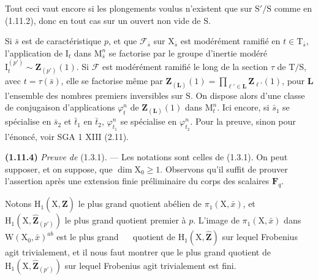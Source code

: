 \documentclass[11pt,leqno]{article}
\newcommand{\Page}[1]{\ifvmode\noindent\else\unskip\ \fi{\footnotesize\textcolor{gray}{[p.\,#1]}}\ \ignorespaces}
\begin{document}
Tout ceci vaut encore si les plongements voulus n’existent que sur \(\mathrm{S}'/\mathrm{S}\) comme en (1.11.2), donc en tout cas sur un ouvert non vide de \(\mathrm{S}\).

Si \(\bar{s}\) est de caractéristique \(p\), et que \(\mathscr{F}_{\bar{s}}\) sur \(\mathrm{X}_{\bar{s}}\) est modérément ramifié en \(t\in\mathrm{T}_{\bar{s}}\), l’application de \(\mathrm{I}_t\) dans \(\mathrm{M}_{\bar{s}}^n\) se factorise par le groupe d’inertie modéré \(\mathrm{I}_t^{(p')}\sim\mathbf{Z}_{(p')}(1)\). Si \(\mathscr{F}\) est modérément ramifié le long de la section \(\tau\) de \(\mathrm{T}/\mathrm{S}\), avec \(t=\tau(\bar{s})\), elle se factorise même par \(\mathbf{Z}_{(\mathbf{L})}(1)=\displaystyle\prod_{\ell'\in\mathbf{L}}\mathbf{Z}_{\ell'}(1)\), pour \(\mathbf{L}\) l’ensemble des nombres premiers inversibles sur \(\mathrm{S}\). On dispose alors d’une classe de conjugaison d’applications \(\varphi_t^n\) de \(\mathbf{Z}_{(\mathbf{L})}(1)\) dans \(\mathrm{M}_t^n\). Ici encore, si \(\bar{s}_1\) se spécialise en \(\bar{s}_2\) et \(\bar{t}_1\) en \(\bar{t}_2\), \(\varphi_{t_1}^n\) se spécialise en \(\varphi_{t_2}^n\). Pour la preuve, sinon pour l’énoncé, voir SGA 1 XIII (2.11).

\textbf{(1.11.4)} \textit{Preuve de} (1.3.1). — Les notations sont celles de (1.3.1). On peut supposer, et on suppose, que \(\dim\mathrm{X}_0\geq1\). Observons qu’il suffit de prouver l’assertion après une extension finie préliminaire du corps des scalaires \(\mathbf{F}_q\).

Notons \(\mathrm{H}_1(\mathrm{X},\widehat{\mathbf{Z}})\) le plus grand quotient abélien de \(\pi_1(\mathrm{X},\bar{x})\), et \(\mathrm{H}_1(\mathrm{X},\widehat{\mathbf{Z}}_{(p')})\) le plus grand quotient premier à \(p\). L’image de \(\pi_1(\mathrm{X},\bar{x})\) dans \(\mathrm{W}(\mathrm{X}_0,\bar{x})^{ab}\) est le plus grand
\Page{186}
quotient de \(\mathrm{H}_1(\mathrm{X},\widehat{\mathbf{Z}})\) sur lequel Frobenius agit trivialement, et il nous faut montrer que le plus grand quotient de \(\mathrm{H}_1(\mathrm{X},\widehat{\mathbf{Z}}_{(p')})\) sur lequel Frobenius agit trivialement est fini.
\end{document}
